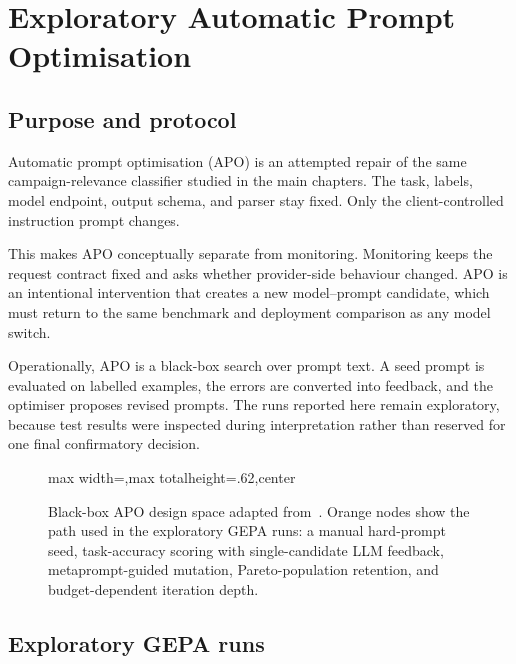 \appendix

\chapter{Exploratory Automatic Prompt Optimisation}
\label{app:prompt-optimisation}

\section{Purpose and protocol}

Automatic prompt optimisation (APO) is an attempted repair of the same
campaign-relevance classifier studied in the main chapters. The task, labels,
model endpoint, output schema, and parser stay fixed. Only the client-controlled
instruction prompt changes.

This makes APO conceptually separate from monitoring. Monitoring keeps the
request contract fixed and asks whether provider-side behaviour changed. APO is
an intentional intervention that creates a new model--prompt candidate, which
must return to the same benchmark and deployment comparison as any model switch.

Operationally, APO is a black-box search over prompt text. A seed prompt is
evaluated on labelled examples, the errors are converted into feedback, and the
optimiser proposes revised prompts. The runs reported here remain exploratory,
because test results were inspected during interpretation rather than reserved
for one final confirmatory decision.

\begin{figure}[htbp]
\centering
\begin{adjustbox}{max width=\linewidth,max totalheight=.62\textheight,center}

\end{adjustbox}
\caption[Taxonomy of automatic prompt optimisation]{Black-box APO design space adapted from~\cite{ramnath2025survey}. Orange nodes show the path used in the exploratory GEPA runs: a manual hard-prompt seed, task-accuracy scoring with single-candidate LLM feedback, metaprompt-guided mutation, Pareto-population retention, and budget-dependent iteration depth.}
\label{fig:app-apo-taxonomy}
\end{figure}

\section{Exploratory GEPA runs}

